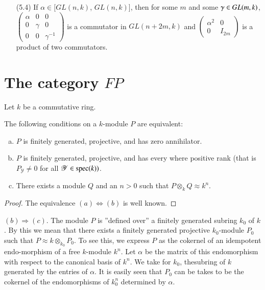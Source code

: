 \begin{itemize}
We\pageoriginale have also the following interesting consequence of
Theorem \ref{chap1:thm3.2}.  

\item[(5.4)] If $\alpha \in [GL(n, k)$, $GL(n, k)]$, then for some $m$
  and some $\gamma \in GL\break (m, k)$,
 $\left(\begin{smallmatrix} 
\alpha &  0 & 0 \\ 
0 & \gamma & 0 \\ 
0 & 0& \gamma^{-1}
 \end{smallmatrix}
  \right)$ is a commutator in $GL(n + 2m, k)$ and
  $\left(\begin{smallmatrix} \alpha^2 & 0 \\ 0 &
    I_{2m} \end{smallmatrix} \right)$ is a product of two
  commutators. 
\end{itemize}


\section{The category \underline{\underline{$FP$}}}\label{chap1:sec6}%

Let $k$ be a commutative ring.  

\begin{prop}\label{chap1:prop6.1}%
 The following conditions on a $k$-module $P$ are equivalent:  
\begin{enumerate}[(a)]
\item $P$ is finitely generated, projective, and has zero
  annihilator. 

\item $P$ is finitely generated, projective, and has every where
  positive rank (that is $P_{\mathscr{Y}} \neq 0$ for all $\mathscr{Y}
  \in  \operatorname{spec} (k))$.  

\item There exists a module $Q$ and an $n > 0$ such that $P \otimes_k
  Q \approx k^n$. 
\end{enumerate}
\end{prop}

\begin{proof}
The equivalence $(a) \Leftrightarrow (b)$ is well known.
\end{proof}

$(b) \Rightarrow (c)$. The module $P$ is ''defined over'' a finitely
generated subring $k_0$ of $k$. By this we mean that there exists a
finitely generated projective $k_0$-module $P_0$ such that $P \approx
k \otimes_{k_0} P_0$. To see this, we express $P$ as the cokernel of an
idempotent endo-morphism of a free $k$-module $k^n$. Let $\alpha$ be
the matrix of this endomorphism with respect to the canonical basis of
$k^n$. We take for $k_0$, 
the\pageoriginale subring of $k$ generated by the entries of
$\alpha$. It is easily 
seen that $P_0$ can be takes to be the cokernel of the endomorphisms of
$k^n_0$ determined by $\alpha$.  

